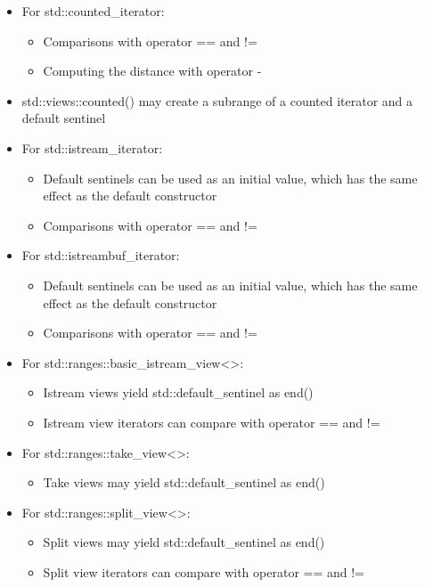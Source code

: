 \begin{itemize}
\item
For std::counted\_iterator:

\begin{itemize}
\item
Comparisons with operator == and !=

\item
Computing the distance with operator -
\end{itemize}

\item
std::views::counted() may create a subrange of a counted iterator and a default sentinel

\item
For std::istream\_iterator:

\begin{itemize}
\item
Default sentinels can be used as an initial value, which has the same effect as the default constructor

\item
Comparisons with operator == and !=
\end{itemize}

\item
For std::istreambuf\_iterator:

\begin{itemize}
\item
Default sentinels can be used as an initial value, which has the same effect as the default constructor

\item
Comparisons with operator == and !=
\end{itemize}

\item
For std::ranges::basic\_istream\_view<>:

\begin{itemize}
\item
Istream views yield std::default\_sentinel as end()

\item
Istream view iterators can compare with operator == and !=
\end{itemize}

\item
For std::ranges::take\_view<>:

\begin{itemize}
\item
Take views may yield std::default\_sentinel as end()
\end{itemize}

\item
For std::ranges::split\_view<>:

\begin{itemize}
\item
Split views may yield std::default\_sentinel as end()

\item
Split view iterators can compare with operator == and !=
\end{itemize}
\end{itemize}


